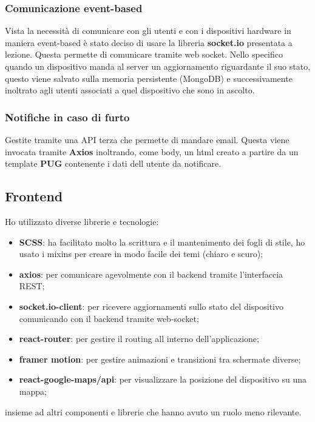\documentclass{report}
\begin{document}
\subsubsection{Comunicazione event-based}
Vista la necessità di comunicare con gli utenti e con i dispositivi hardware in maniera event-based è stato deciso di usare la libreria \textbf{socket.io} presentata a lezione. Questa permette di comunicare tramite web socket. Nello specifico quando un dispositivo manda al server un aggiornamento riguardante il suo stato, questo viene salvato sulla memoria persistente (MongoDB) e successivamente inoltrato agli utenti associati a quel dispositivo che sono in ascolto.

\subsubsection{Notifiche in caso di furto}
Gestite tramite una API terza che permette di mandare email. Questa viene invocata tramite \textbf{Axios} inoltrando, come body, un html creato a partire da un template \textbf{PUG} contenente i dati dell utente da notificare.

\subsection{Frontend}
Ho utilizzato diverse librerie e tecnologie:
\begin{itemize}
    \item \textbf{SCSS}: ha facilitato molto la scrittura e il mantenimento dei fogli di stile, ho usato i mixins per creare in modo facile dei temi (chiaro e scuro);
    \item \textbf{axios}: per comunicare agevolmente con il backend tramite l'interfaccia REST;
    \item \textbf{socket.io-client}: per ricevere aggiornamenti sullo stato del dispositivo comunicando con il backend tramite web-socket;
    \item \textbf{react-router}: per gestire il routing all interno dell'applicazione;
    \item \textbf{framer motion}: per gestire animazioni e transizioni tra schermate diverse;
    \item \textbf{react-google-maps/api}: per visualizzare la posizione del dispositivo su una mappa;
\end{itemize}
insieme ad altri componenti e librerie che hanno avuto un ruolo meno rilevante.
\end{document}
